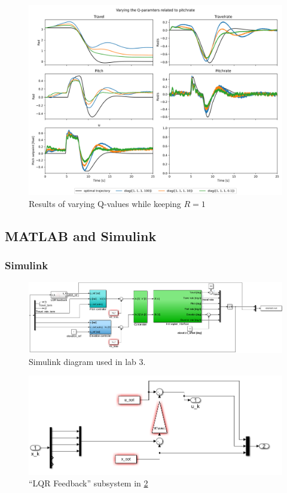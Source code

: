 \documentclass[../main.tex]{subfiles}
\begin{document}
\begin{figure}[h]
	\includegraphics[width=\linewidth]{figures/LAB3_Q_variations_pitchrate.png}
	\caption{Results of varying Q-values while keeping $R=1$}
	\label{fig:LAB3_Q_variations_pitchrate}
\end{figure}


\clearpage

\subsection{MATLAB and Simulink}

\subsubsection{Simulink}
\begin{figure}[h]
	\centering
	\includegraphics[width=1\linewidth, keepaspectratio]{code/lab3_simulink_1}
	\caption{Simulink diagram used in lab 3.}
	\label{fig:lab3_simulink}
\end{figure}
\begin{figure}[h]
	\centering
	\includegraphics[width=1\linewidth, keepaspectratio]{code/lab3_simulink_2}
	\caption{``LQR Feedback'' subsystem in \cref{fig:lab3_simulink}}
	\label{fig:lab3_simulink_lqr}
\end{figure}
\end{document}
